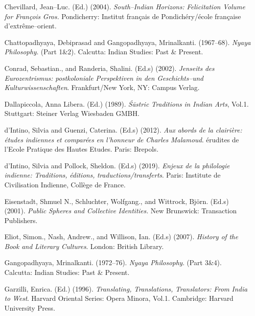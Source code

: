  \item Chevillard, Jean–Luc. (Ed.) (2004). \textit{South–Indian Horizons: Felicitation Volume for François Gros.} Pondicherry: Institut français de Pondichéry/école française d'extrême–orient.

 \item Chattopadhyaya, Debiprasad and Gangopadhyaya, Mrinalkanti. (1967–68). \textit{Nyaya Philosophy}. (Part 1\&2). Calcutta: Indian Studies: Past \& Present.

 \item Conrad, Sebastian., and Randeria, Shalini. (Ed.s) (2002). \textit{Jenseits des Eurozentrismus: postkoloniale Perspektiven in den Geschichts–und Kulturwissenschaften}. Frankfurt/New York, NY: Campus Verlag.

 \item Dallapiccola, Anna Libera. (Ed.) (1989). \textit{Śāstric Traditions in Indian Arts}, Vol.1. Stuttgart: Steiner Verlag Wiesbaden GMBH.

 \item d’Intino, Silvia and Guenzi, Caterina. (Ed.s) (2012).\textit{ Aux abords de la clairière: études indiennes et comparées en l’honneur de Charles Malamoud}. érudites de l’Ecole Pratique des Hautes Etudes. Paris: Brepols.

 \item d’Intino, Silvia and Pollock, Sheldon. (Ed.s) (2019). \textit{Enjeux de la philologie indienne: Traditions, éditions, traductions/transferts}. Paris: Institute de Civilisation Indienne, Collège de France.

 \item Eisenstadt, Shmuel N., Schluchter, Wolfgang., and Wittrock, Björn. (Ed.s) (2001). \textit{Public Spheres and Collective Identities. }New Brunswick: Transaction Publishers.

 \item Eliot, Simon., Nash, Andrew., and Willison, Ian. (Ed.s) (2007). \textit{History of the Book and Literary Cultures}. London: British Library.

 \item Gangopadhyaya, Mrinalkanti. (1972–76). \textit{Nyaya Philosophy}. (Part 3\&4). Calcutta: Indian Studies: Past \& Present.

 \item Garzilli, Enrica. (Ed.) (1996).\textit{ Translating, Translations, Translators: From India to West}. Harvard Oriental Series: Opera Minora, Vol.1. Cambridge: Harvard University Press.

